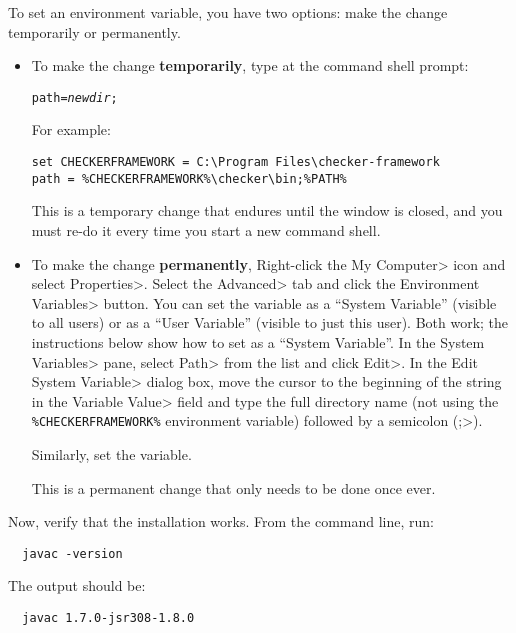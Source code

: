 \begin{enumerate}

To set an environment variable, you have two options:  make the change
temporarily or permanently.
\begin{itemize}
\item
To make the change \textbf{temporarily}, type at the command shell prompt:

\begin{alltt}
path = \emph{newdir};%PATH%
\end{alltt}

For example:

\begin{Verbatim}
set CHECKERFRAMEWORK = C:\Program Files\checker-framework
path = %CHECKERFRAMEWORK%\checker\bin;%PATH%
\end{Verbatim}

This is a temporary change that endures until the window is closed, and you
must re-do it every time you start a new command shell.

\item
To make the change \textbf{permanently},
Right-click the \<My Computer> icon and
select \<Properties>. Select the \<Advanced> tab and click the
\<Environment Variables> button. You can set the variable as a ``System
Variable'' (visible to all users) or as a ``User Variable'' (visible to
just this user).  Both work; the instructions below show how to set as a
``System Variable''.
In the \<System Variables> pane, select
\<Path> from the list and click \<Edit>. In the \<Edit System Variable>
dialog box, move the cursor to the beginning of the string in the
\<Variable Value> field and type the full directory name (not using the
\verb|%CHECKERFRAMEWORK%| environment variable) followed by a
semicolon (\<;>).

Similarly, set the  variable.

This is a permanent change that only needs to be done once ever.
\end{itemize}



Now, verify that the installation works.  From the command line, run:

\begin{Verbatim}
  javac -version
\end{Verbatim}

The output should be:

\begin{Verbatim}
  javac 1.7.0-jsr308-1.8.0
\end{Verbatim}

\end{enumerate}


